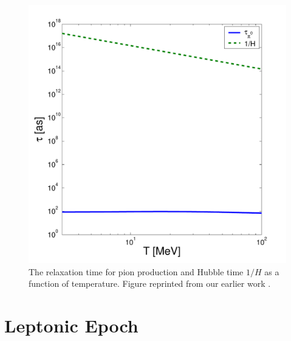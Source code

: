 \documentclass[universe,article,submit,moreauthors,pdftex,a4paper]{Definitions/mdpi}
\begin{document}
\begin{figure}[h]
\centering
\includegraphics[width=0.7\columnwidth]{taupi0.pdf}
\caption{The relaxation time for pion production and Hubble time $1/H$ as a function of temperature. Figure reprinted from our earlier work \cite{Kuznetsova:2009xh}.}
\label{taumupi002}
\end{figure}


\section{Leptonic Epoch} \label{sec:Leptonic}
\end{document}
